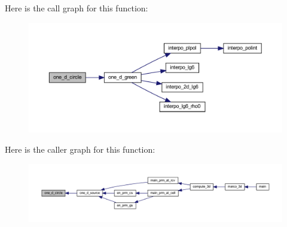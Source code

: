 Here is the call graph for this function\+:
\nopagebreak
\begin{figure}[H]
\begin{center}
\leavevmode
\includegraphics[width=350pt]{Marco_8f90_acfdc9c842d9566d75829e363d5bf3f41_cgraph}
\end{center}
\end{figure}
Here is the caller graph for this function\+:
\nopagebreak
\begin{figure}[H]
\begin{center}
\leavevmode
\includegraphics[width=350pt]{Marco_8f90_acfdc9c842d9566d75829e363d5bf3f41_icgraph}
\end{center}
\end{figure}
\mbox{\label{Marco_8f90_a8366534c83a3217b6271dd5a9d5b8917}} 
